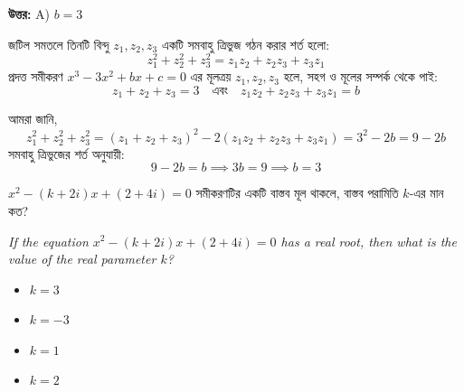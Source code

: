 \documentclass[12pt, a4paper]{article}
\begin{document}
\vspace{0.5em}
\begin{tcolorbox}[answerbox]
    \textbf{\color{success} উত্তর:} A) $b = 3$
\end{tcolorbox}
\vspace{1em}

\begin{tcolorbox}[solutionbox={সমাধান (Solution)}]
    \noindent
    জটিল সমতলে তিনটি বিন্দু $z_1, z_2, z_3$ একটি সমবাহু ত্রিভুজ গঠন করার শর্ত হলো:
    \[ z_1^2 + z_2^2 + z_3^2 = z_1 z_2 + z_2 z_3 + z_3 z_1 \]
    প্রদত্ত সমীকরণ $x^3 - 3x^2 + bx + c = 0$ এর মূলত্রয় $z_1, z_2, z_3$ হলে, সহগ ও মূলের সম্পর্ক থেকে পাই:
    \[ z_1 + z_2 + z_3 = 3 \quad \text{এবং} \quad z_1 z_2 + z_2 z_3 + z_3 z_1 = b \]
    
    \vspace{0.5em}
    আমরা জানি, 
    \[ z_1^2 + z_2^2 + z_3^2 = (z_1 + z_2 + z_3)^2 - 2(z_1 z_2 + z_2 z_3 + z_3 z_1) = 3^2 - 2b = 9 - 2b \]
    সমবাহু ত্রিভুজের শর্ত অনুযায়ী:
    \[ 9 - 2b = b \implies 3b = 9 \implies b = 3 \]
\end{tcolorbox}
\vspace{1em}

\begin{tcolorbox}[questionbox={প্রশ্ন (Question) 47}]
    \noindent
    $x^2 - (k+2i)x + (2+4i) = 0$ সমীকরণটির একটি বাস্তব মূল থাকলে, বাস্তব পরামিতি $k$-এর মান কত?
    
    \vspace{0.8em}
    \begin{english}
    \noindent\textit{\color{darkgray}
    If the equation $x^2 - (k+2i)x + (2+4i) = 0$ has a real root, then what is the value of the real parameter $k$?
    }
    \end{english}
\end{tcolorbox}

\begin{itemize}[label={}, leftmargin=1cm, itemsep=0.5em]
    \item[\textbf{A)}] $k = 3$
    \item[\textbf{B)}] $k = -3$
    \item[\textbf{C)}] $k = 1$
    \item[\textbf{D)}] $k = 2$
\end{itemize}
\end{document}

